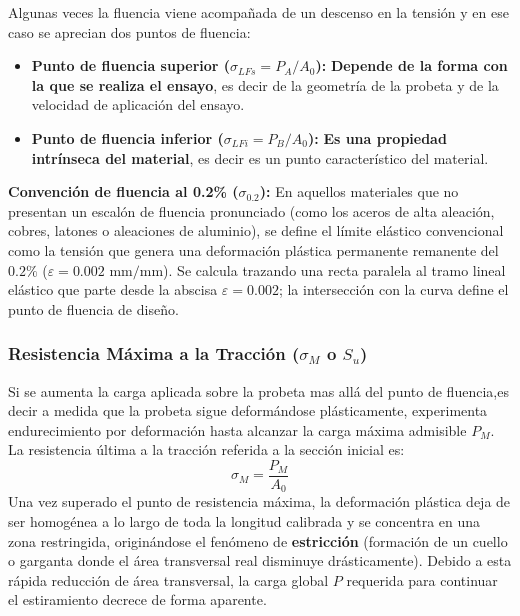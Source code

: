Algunas veces la fluencia viene acompañada de un descenso en la tensión y en ese caso se aprecian dos puntos de fluencia:
\begin{itemize}
    \item \textbf{Punto de fluencia superior ($\sigma_{LFs} = P_A/A_0$):} \textbf{Depende de la forma con la que se realiza el ensayo}, es decir de la geometría de la probeta y de la velocidad de aplicación del ensayo.
    \item \textbf{Punto de fluencia inferior ($\sigma_{LFi} = P_B/A_0$):} \textbf{Es una propiedad intrínseca del material}, es decir es un punto característico del material.
\end{itemize}

\textbf{Convención de fluencia al 0.2\% ($\sigma_{0.2}$):} En aquellos materiales que no presentan un escalón de fluencia pronunciado (como los aceros de alta aleación, cobres, latones o aleaciones de aluminio), se define el límite elástico convencional como la tensión que genera una deformación plástica permanente remanente del $0.2\%$ ($\varepsilon = 0.002\text{ mm}/\text{mm}$). Se calcula trazando una recta paralela al tramo lineal elástico que parte desde la abscisa $\varepsilon = 0.002$; la intersección con la curva define el punto de fluencia de diseño.
\subsubsection{Resistencia Máxima a la Tracción ($\sigma_M$ o $S_u$)}
Si se aumenta la carga aplicada sobre la probeta mas allá del punto de fluencia,es decir a medida que la probeta sigue deformándose plásticamente, experimenta endurecimiento por deformación hasta alcanzar la carga máxima admisible $P_M$. La resistencia última a la tracción referida a la sección inicial es:
\begin{equation}
    \sigma_M = \frac{P_M}{A_0}
\end{equation}
Una vez superado el punto de resistencia máxima, la deformación plástica deja de ser homogénea a lo largo de toda la longitud calibrada y se concentra en una zona restringida, originándose el fenómeno de \textbf{estricción} (formación de un cuello o garganta donde el área transversal real disminuye drásticamente). Debido a esta rápida reducción de área transversal, la carga global $P$ requerida para continuar el estiramiento decrece de forma aparente.
\newpage
